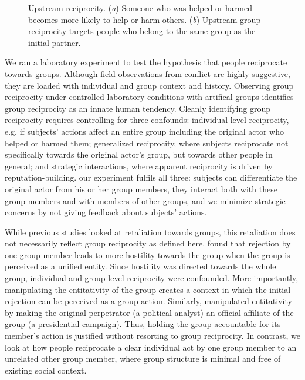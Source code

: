 \documentclass[12pt,a4paper]{article}\usepackage[]{graphicx}\usepackage[]{color}
\begin{document}
\begin{figure}
\begin{center}
\begin{subfigure}[b]{0.4\textwidth}
            \caption{}\label{group}
        \end{subfigure}
        \caption{Upstream reciprocity. (\textit{a}) Someone who was helped or harmed becomes more likely to help or harm others. (\textit{b})
    Upstream group reciprocity targets people who belong to
    the same group as the initial partner.}
        \label{fig:illustration}
	\end{center}
\end{figure}

We ran a laboratory experiment to test the hypothesis that people reciprocate towards groups. Although field observations from conflict are highly suggestive, they are loaded with individual and group context and history. Observing group reciprocity under controlled laboratory conditions with artifical groups identifies group reciprocity as an innate human tendency.
Cleanly identifying group reciprocity requires controlling for three confounds: individual level reciprocity, e.g. if subjects' actions affect an entire group including the original actor who helped or harmed them; generalized reciprocity, where subjects reciprocate not specifically towards the original actor’s group, but towards other people in general; and strategic interactions, where apparent reciprocity is driven by reputation-building. 
our experiment fulfils all three: subjects can differentiate the original actor from his or her group members, they interact both with these group members and with members of other groups, and we minimize strategic concerns by not giving feedback about subjects' actions.


While previous studies looked at retaliation towards groups, this retaliation does not necessarily reflect group reciprocity as defined here. \citet{gaertner2008whenrejection} found that rejection by one group member leads to more hostility towards the group when the group is perceived as a unified entity. Since hostility was directed towards the whole group, individual and group level reciprocity were confounded. More importantly, manipulating the entitativity of the group creates a context in which the initial rejection can be perceived as a group action. %
Similarly, \citet{stenstrom2008theroles} manipulated entitativity by making the original perpetrator (a political analyst) an official affiliate of the group (a presidential campaign). Thus, holding the group accountable for its member's action is justified without resorting to group reciprocity. In contrast, we look at how people reciprocate a clear individual act by one group member to an unrelated other group member, where group structure is minimal and free of existing social context. 
\end{document}
